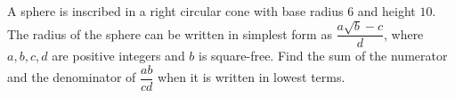 A sphere is inscribed in a right circular cone with base radius $6$ and height $10$. The radius of the sphere can be written in simplest form as $\dfrac{a\sqrt{b}-c}{d}$, where $a,b,c,d$ are positive integers and $b$ is square-free. Find the sum of the numerator and the denominator of $\dfrac{ab}{cd}$ when it is written in lowest terms.
